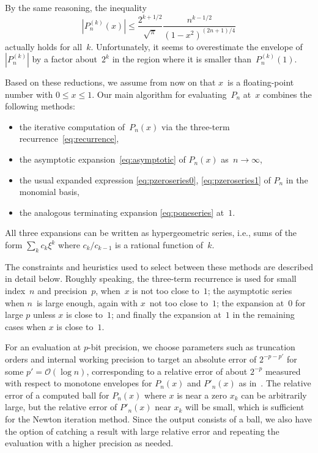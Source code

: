 \documentclass[nohypdvips,review]{siamart0216}
\newcommand{\OO}{\mathcal{O}}
\begin{document}
\begin{remark}
By the same reasoning, the inequality
\[ |P^{(k)}_n(x)| \leq \frac{2^{k+1/2}}{\sqrt{\pi}}
                       \frac{n^{k-1/2}}{(1 - x^2)^{(2n+1)/4}} \]
actually holds for all~$k$. Unfortunately, it seems to
overestimate the envelope of~$|P_n^{(k)}|$ by a factor about~$2^k$
in the region where it is smaller than~$P_n^{(k)}(1)$.
\end{remark}

Based on these reductions, we assume from now on that $x$~is a
floating-point number with $0 \leq x \leq 1$.
Our main algorithm for evaluating~$P_n$ at~$x$ combines the following
methods:
\begin{itemize}
  \item the iterative computation of~$P_n(x)$
  via the three-term recurrence~\cref{eq:recurrence},
  \item the asymptotic expansion~\cref{eq:asymptotic}
  of $P_n(x)$ as~$n \to \infty$,
  \item the usual expanded expression \cref{eq:pzeroseries0},
  \cref{eq:pzeroseries1} of $P_n$ in the monomial basis,
  \item the analogous terminating expansion \cref{eq:poneseries}
  at~$1$.
\end{itemize}
All three expansions can be written as hypergeometric
series, i.e., sums of the form $\sum_k c_k \xi^k$ where $c_k/c_{k-1}$
is a rational function of~$k$.

The constraints and heuristics used to select between these methods
are described in detail below.
Roughly speaking,
the three-term recurrence is used for small index~$n$ and precision~$p$, when~$x$
is not too close to~$1$;
the asymptotic series when $n$~is large enough, again with $x$~not too
close to~$1$;
the expansion at~$0$ for large $p$ unless $x$ is close to~$1$;
and finally the expansion at~$1$ in the remaining cases
when $x$ is close to~$1$.

For an evaluation at $p$-bit precision, we choose parameters such as
truncation orders and internal working precision to target an absolute
error of $2^{-p-p'}$ for some $p' = \OO(\log n)$, corresponding to
a relative error of about $2^{-p}$ measured with respect
to monotone envelopes for $P_n(x)$ and $P'_n(x)$ as in~\cite{Bogaert2012}.
The relative error of a computed ball for $P_n(x)$ where $x$ is near a zero $x_k$
can be arbitrarily large, but the relative error of $P'_n(x)$ near $x_k$
will be small, which is sufficient for the Newton iteration method.
Since the output consists of a ball, we also have the option of catching
a result with large relative error and repeating the evaluation with a
higher precision as needed.
\end{document}
